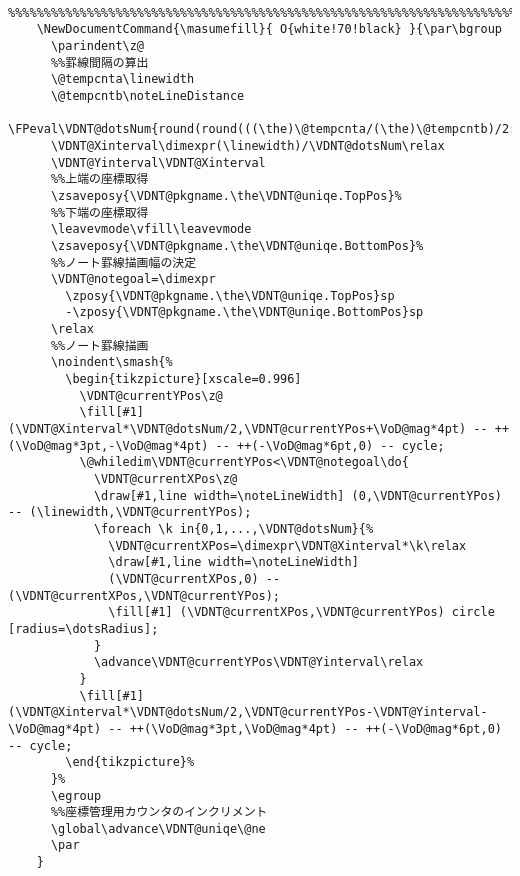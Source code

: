 \documentclass[a4paper,12pt]{article}
\begin{document}
\begin{lstlisting}
    %%%%%%%%%%%%%%%%%%%%%%%%%%%%%%%%%%%%%%%%%%%%%%%%%%%%%%%%%%%%%%%%%%%%%%%%%%%%%%%%%%%%%%%%%
    \NewDocumentCommand{\masumefill}{ O{white!70!black} }{\par\bgroup
      \parindent\z@
      %%罫線間隔の算出
      \@tempcnta\linewidth
      \@tempcntb\noteLineDistance
      \FPeval\VDNT@dotsNum{round(round(((\the)\@tempcnta/(\the)\@tempcntb)/2:0)*2:0)}%
      \VDNT@Xinterval\dimexpr(\linewidth)/\VDNT@dotsNum\relax
      \VDNT@Yinterval\VDNT@Xinterval
      %%上端の座標取得
      \zsaveposy{\VDNT@pkgname.\the\VDNT@uniqe.TopPos}%
      %%下端の座標取得
      \leavevmode\vfill\leavevmode
      \zsaveposy{\VDNT@pkgname.\the\VDNT@uniqe.BottomPos}%
      %%ノート罫線描画幅の決定
      \VDNT@notegoal=\dimexpr
        \zposy{\VDNT@pkgname.\the\VDNT@uniqe.TopPos}sp
        -\zposy{\VDNT@pkgname.\the\VDNT@uniqe.BottomPos}sp
      \relax
      %%ノート罫線描画
      \noindent\smash{%
        \begin{tikzpicture}[xscale=0.996]
          \VDNT@currentYPos\z@
          \fill[#1] (\VDNT@Xinterval*\VDNT@dotsNum/2,\VDNT@currentYPos+\VoD@mag*4pt) -- ++(\VoD@mag*3pt,-\VoD@mag*4pt) -- ++(-\VoD@mag*6pt,0) -- cycle;
          \@whiledim\VDNT@currentYPos<\VDNT@notegoal\do{
            \VDNT@currentXPos\z@
            \draw[#1,line width=\noteLineWidth] (0,\VDNT@currentYPos) -- (\linewidth,\VDNT@currentYPos);
            \foreach \k in{0,1,...,\VDNT@dotsNum}{%
              \VDNT@currentXPos=\dimexpr\VDNT@Xinterval*\k\relax
              \draw[#1,line width=\noteLineWidth]
              (\VDNT@currentXPos,0) -- (\VDNT@currentXPos,\VDNT@currentYPos);
              \fill[#1] (\VDNT@currentXPos,\VDNT@currentYPos) circle [radius=\dotsRadius];
            }
            \advance\VDNT@currentYPos\VDNT@Yinterval\relax
          }
          \fill[#1] (\VDNT@Xinterval*\VDNT@dotsNum/2,\VDNT@currentYPos-\VDNT@Yinterval-\VoD@mag*4pt) -- ++(\VoD@mag*3pt,\VoD@mag*4pt) -- ++(-\VoD@mag*6pt,0) -- cycle;
        \end{tikzpicture}%
      }%
      \egroup
      %%座標管理用カウンタのインクリメント
      \global\advance\VDNT@uniqe\@ne
      \par
    }



\end{lstlisting}
\end{document}
